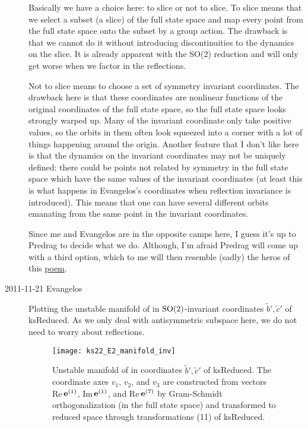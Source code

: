 \begin{description}
    Basically we have a choice here: to slice or not to slice.  To slice means that we select a subset (a slice) of the full state space and map every point from the full state space onto the subset by a group action.  The drawback is that we cannot do it without introducing discontinuities to the dynamics on the slice.  It is already apparent with the SO(2) reduction and will only get worse when we factor in the reflections.

    Not to slice means to choose a set of symmetry invariant coordinates.  The drawback here is that these coordinates are nonlinear functions of the original coordinates of the full state space, so the full state space looks strongly warped up.  Many of the invariant coordinate only take positive values, so the orbits in them often look squeezed into a corner with a lot of things happening around the origin.  Another feature that I don't like here is that the dynamics on the invariant coordinates may not be uniquely defined: there could be points not related by symmetry in the full state space which have the same values of the invariant coordinates (at least this is what happens in Evangelos's coordinates when reflection invariance is introduced).  This means that one can have several different orbits emanating from the same point in the invariant coordinates.

    Since me and Evangelos are in the opposite camps here, I guess it's
    up to Predrag to decide what we do.  Although, I'm afraid Predrag
    will come up with a third option, which to me will then resemble
    (sadly) the heros of this
    \href{http://www.poemhunter.com/poem/swan-pike-and-crawfish/}{poem}.

\item[2011-11-21 Evangelos] Plotting the unstable manifold of  in $\SOn{2}$-invariant
coordinates $\tilde{b}',\tilde{c}'$ of ksReduced. As we only deal with antisymmetric subspace
here, we do not need to worry about reflections.

\begin{figure}[ht]
 \begin{center}
  \texttt{[image: ks22\_E2\_manifold\_inv]}
 \end{center}
\caption{Unstable manifold of  in coordinates
$\tilde{b}',\tilde{c}'$ of ksReduced. The coordinate axes $v_1$, $v_2$,
and $v_3$ are constructed from vectors Re\,$\jEigvec[1]$,
Im\,$\jEigvec[1]$, and {Re\,}$\jEigvec[7]$ by Gram-Schmidt
orthogonalization (in the full state space) and transformed to reduced space
through transformations (11) of ksReduced.
  }
\label{f:ks22_E2_inv}
\end{figure}


\end{description}
